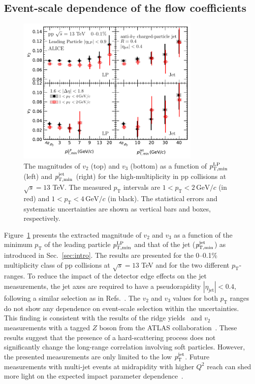 \subsection{Event-scale dependence of the flow coefficients}
\begin{figure}[h!]
	\centering
	\hspace{-3em}\includegraphics[width=0.8\textwidth]{figures/FIG6_vn_LP.pdf}
	\caption{The magnitudes of $v_2$ (top) and $v_3$ (bottom) as a function of $\it{p}^{\rm{LP}}_{\rm{T,min}}$ (left) and $\it{p}^{\rm{jet}}_{\rm{T,min}}$ (right) for the high-multiplicity in pp collisions at $\sqrt{s}=13$ TeV. The measured $p_{\mathrm{T}}$ intervals are $1<p_{\mathrm{T}}<2\,\mathrm{GeV}/c$ (in red) and $1<p_{\mathrm{T}}<4\,\mathrm{GeV}/c$ (in black). The statistical errors and systematic uncertainties are shown as vertical bars and boxes, respectively.}
	\label{fig:LPjet23}
\end{figure}    

Figure~\ref{fig:LPjet23} presents the extracted magnitude of $v_2$ and $v_3$ as a function of the minimum $p_\mathrm{T}$ of the leading particle $\it{p}^{\rm{LP}}_{\rm{T,min}}$ and that of the jet ($\it{p}^{\rm{jet}}_{\rm{T,min}}$) as introduced in Sec.~\ref{sec:intro}. 
The results are presented for the 0–0.1\% multiplicity class of pp collisions at $\sqrt{s}= 13$ TeV and for the two different $p_\mathrm{T}$-ranges.
To reduce the impact of the detector edge effects on the jet measurements, the jet axes are required to have a pseudorapidity $|\eta_\mathrm{jet}|<0.4$, following a similar selection as in Refs.~\cite{CDF:2001onq, ATLAS:2014riz, CMS:2015jdl}. The $v_2$ and $v_3$ values for both $p_\mathrm{T}$ ranges do not show any dependence on event-scale selection within the uncertainties. This finding is consistent with the results of the ridge yields~\cite{ALICE:2021nir} and $v_{2}$ measurements with a tagged $Z$ boson from the ATLAS collaboration~\cite{Aaboud:2019mcw}. These results suggest that the presence of a hard-scattering process does not significantly change the long-range correlation involving soft particles.
However, the presented measurements are only limited to the low $\it{p}^{\rm{jet}}_{\rm{T}}$. Future measurements with multi-jet events at midrapidity with higher $Q^2$ reach can shed more light on the expected impact parameter dependence~\cite{Sjostrand:1986ep,Frankfurt:2003td,Frankfurt:2010ea}.

